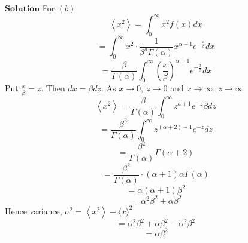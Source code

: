 \documentclass{article}
\begin{document}
\begin{flushleft}
$\boxed{\textbf{Solution}}$ For $(b)$ 
$$
\left\langle x^{2}\right\rangle=\int_{0}^{\infty} x^{2} f(x) d x
$$
$$=\int_{0}^{\infty} x^{2} \cdot \frac{1}{\beta^{a} \Gamma(\alpha)} x^{\alpha-1} e^{-\frac{x}{\beta}} d x$$
$$=\frac{\beta}{\Gamma(\alpha)} \int_{0}^{\infty}\left(\frac{x}{\beta}\right)^{\alpha+1} e^{-\frac{x}{\beta}} d x$$
Put $\frac{x}{\beta}=z .$ Then $d x=\beta d z .$ As $x \rightarrow 0, \  z \rightarrow 0$ and $x \rightarrow \infty, \  z \rightarrow \infty$
$$
\left\langle x^{2}\right\rangle=\frac{\beta}{\Gamma(\alpha)} \int_{0}^{\infty} z^{a+1} e^{-z} \beta d z
$$
$$=\frac{\beta^{2}}{\Gamma(\alpha)} \int_{0}^{\infty} z^{(\alpha+2)-1} e^{-z} d z$$
$$=\frac{\beta^{2}}{\Gamma(\alpha)} \Gamma(\alpha+2)$$
$$=\frac{\beta^{2}}{\Gamma(\alpha)} \cdot(\alpha+1) \alpha \Gamma(\alpha)$$
$$=\alpha(\alpha+1) \beta^{2}$$
$$=\alpha^{2} \beta^{2}+\alpha \beta^{2}$$
Hence variance, $\sigma^{2}=\left\langle x^{2}\right\rangle-\langle x\rangle^{2}$
$$=\alpha^{2} \beta^{2}+\alpha \beta^{2}-\alpha^{2} \beta^{2}$$
$$=\alpha \beta^{2}$$



\end{flushleft}
\end{document}
